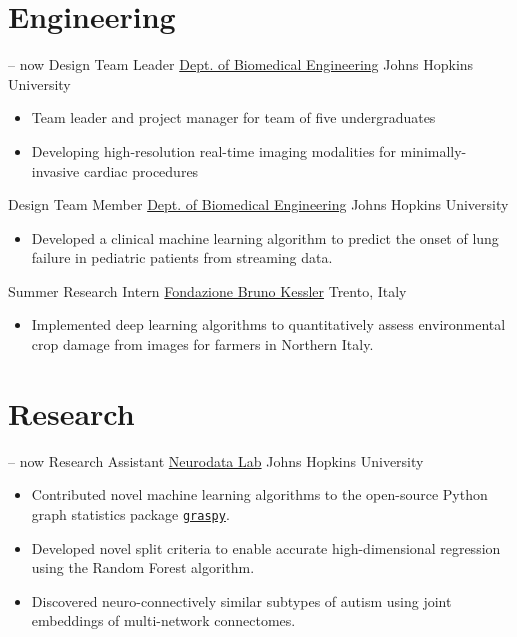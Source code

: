\section{Engineering}
\cventry
{-- now}
{Design Team Leader}
{\href{https://cbid.bme.jhu.edu/academics/undergraduate-studies/}{Dept. of Biomedical Engineering}}
{Johns Hopkins University}
{}
{
\begin{itemize}
    \item Team leader and project manager for team of five undergraduates
    \item Developing high-resolution real-time imaging modalities for minimally-invasive cardiac procedures
\end{itemize}{}
}

\cventry
{\dates[12.2017-05.2018]}
{Design Team Member}
{\href{https://cbid.bme.jhu.edu/academics/undergraduate-studies/}{Dept. of Biomedical Engineering}}
{Johns Hopkins University}
{}
{
\begin{itemize}
    \item Developed a clinical machine learning algorithm to predict the onset of lung failure in pediatric patients from streaming data.
\end{itemize}{}
}

\cventry
{\dates[06.2017-07.2017]}
{Summer Research Intern}
{\href{https://webvalley.fbk.eu}{Fondazione Bruno Kessler}}
{Trento, Italy}
{}
{
\begin{itemize}
    \item Implemented deep learning algorithms to quantitatively assess environmental crop damage from images for farmers in Northern Italy.
\end{itemize}{}
}


\section{Research}

\cventry
{-- now}
{Research Assistant}
{\href{https://neurodata.io}{Neurodata Lab}}
{Johns Hopkins University}
{}
{
\begin{itemize}
    \item Contributed novel machine learning algorithms to the open-source Python graph statistics package \href{https://github.com/neurodata/graspy}{\texttt{graspy}}.
    \item Developed novel split criteria to enable accurate high-dimensional regression using the Random Forest algorithm.
    \item Discovered neuro-connectively similar subtypes of autism using joint embeddings of multi-network connectomes.
\end{itemize}
}

